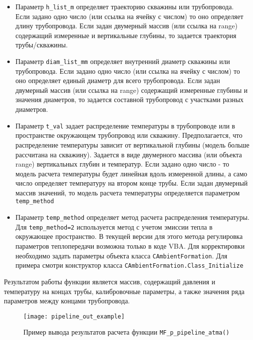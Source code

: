 \begin{itemize}
	\item Параметр 	\texttt{h_list_m} определяет траекторию скважины или трубопровода. Если задано одно число (или ссылка на ячейку с числом) то оно определяет длину трубопровода. Если задан двумерный массив (или ссылка на range) содержащий измеренные и вертикальные глубины, то задается траектория трубы/скважины. 
	\item Параметр 	\texttt{diam_list_mm} определяет внутренний диаметр скважины или трубопровода. Если задано одно число (или ссылка на ячейку с числом) то оно определяет единый диаметр для всего трубопровода. Если задан двумерный массив (или ссылка на range) содержащий измеренные глубины и значения диаметров, то задается составной трубопровод с участками разных диаметров. 
	\item Параметр \texttt{t_val} задает распределение температуры в трубопроводе или в пространстве окружающем трубопровод или скважину. Предполагается, что распределение температуры зависит от вертикальной глубины (модель больше рассчитана на скважину). Задается в виде двумерного массива (или объекта range) вертикальных глубин и температур. Если задано одно число - то модель расчета температуры будет линейная вдоль измеренной длины, а само число определяет температуру на втором конце трубы. Если задан двумерный массив значений, то модель расчета температуры определяется параметром \texttt{temp_method}
	\item Параметр \texttt{temp_method} определяет метод расчета распределения температуры. Для \texttt{temp_method=2} используется метод с учетом эмиссии тепла в окружающее пространство. В текущей версии \unf{} для этого метода регулировка параметров теплопередачи возможна только в коде VBA. Для корректировки необходимо задать параметры объекта класса  \texttt{CAmbientFormation}. Для примера смотри конструктор класса  \texttt{CAmbientFormation.Class_Initialize}
	
\end{itemize}



Результатом работы функции является массив, содержащий давления и температуру на концах трубы, калибровочные параметры, а также значения ряда параметров между концами трубопровода.

\begin{figure}[ht]
	\texttt{[image: pipeline\_out\_example]}
	\caption{Пример вывода результатов расчета функции \texttt{MF_p_pipeline_atma()}}
	\label{ris:pipeline_out_example}
\end{figure}


\newpage

